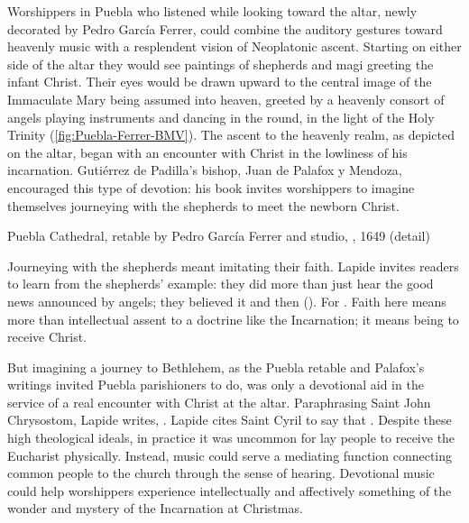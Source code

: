 Worshippers in Puebla who listened while looking toward the altar, newly
decorated by Pedro García Ferrer, could combine the auditory gestures toward
heavenly music with a resplendent vision of Neoplatonic ascent.%
    \Autocites
    {Merlo:PueblaCat}
    {Gali:GarciaFerrer}
Starting on either side of the altar they would see paintings of shepherds and
magi greeting the infant Christ.
Their eyes would be drawn upward to the central image of the Immaculate Mary
being assumed into heaven, greeted by a heavenly consort of angels playing
instruments and dancing in the round, in the light of the Holy Trinity
(\cref{fig:Puebla-Ferrer-BMV}).%
   \Autocite[The complex is in part a visual embodiment of musical encomium:][]
   {Schmidt:Lob_der_Musik}
The ascent to the heavenly realm, as depicted on the altar, began with an
encounter with Christ in the lowliness of his incarnation. 
Gutiérrez de Padilla's bishop, Juan de  Palafox y Mendoza, encouraged this type
of devotion: his book  invites worshippers to
imagine themselves journeying with the shepherds to meet the newborn Christ.%
    \Autocite{Palafox:Nochebuena}

{Puebla Cathedral, retable by Pedro García Ferrer and studio,
, 1649 (detail)} 

Journeying with the shepherds meant imitating their faith.
Lapide invites readers to learn from the shepherds' example: they did more than
just hear the good news announced by angels; they believed it and then
().
For .%
    \Autocite[677, on ]{Lapide:Gospels19C}
Faith here means more than intellectual assent to a doctrine like the
Incarnation; it means being  to receive Christ.

But imagining a journey to Bethlehem, as the Puebla retable and Palafox's
writings invited Puebla parishioners to do, was only a devotional aid in the
service of a real encounter with Christ at the altar.
Paraphrasing Saint John Chrysostom, Lapide writes, .%
    \Autocite[672, on ]{Lapide:Gospels19C}
Lapide cites Saint Cyril to say that .
Despite these high theological ideals, in practice it was uncommon for lay
people to receive the Eucharist physically.
Instead, music could serve a mediating function connecting common people to the
church through the sense of hearing.
Devotional music could help worshippers experience intellectually and
affectively something of the wonder and mystery of the Incarnation at
Christmas.

